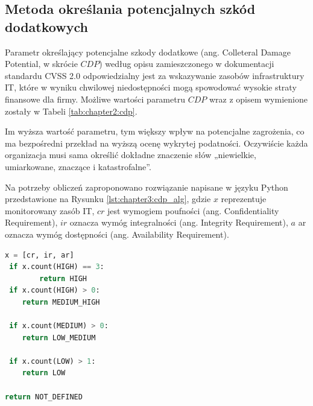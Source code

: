 
\subsection{Metoda określania potencjalnych szkód dodatkowych}
\label{sec:cdp}
Parametr określający potencjalne szkody dodatkowe (ang. Colleteral Damage Potential, w skrócie $CDP$) według opisu zamieszczonego w dokumentacji standardu CVSS 2.0 \cite{cvsspecification} odpowiedzialny jest za wskazywanie zasobów infrastruktury IT, które w wyniku chwilowej niedostępności mogą spowodować wysokie straty finansowe dla firmy. Możliwe wartości parametru $CDP$ wraz z opisem wymienione zostały w Tabeli \ref{tab:chapter2:cdp}. 


\bigbreak
Im wyższa wartość parametru, tym większy wpływ na potencjalne zagrożenia, co ma bezpośredni przekład na wyższą ocenę wykrytej podatności. Oczywiście każda organizacja musi sama określić dokładne znaczenie słów „niewielkie, umiarkowane, znaczące i katastrofalne”.

\bigbreak
Na potrzeby obliczeń zaproponowano rozwiązanie napisane w języku Python przedstawione na Rysunku \ref{lst:chapter3:cdp_alg}, gdzie $x$ reprezentuje monitorowany zasób IT, $cr$ jest wymogiem poufności (ang. Confidentiality Requirement), $ir$ oznacza wymóg integralności (ang. Integrity Requirement), $a$ ar oznacza wymóg dostępności (ang. Availability Requirement).

\begin{lstlisting}[caption={Algorytm określający wartość parametru. CDP dla monitorowanego zasobu.}, label={lst:chapter3:cdp_alg}, language=Python, captionpos=b]
 x = [cr, ir, ar]
 if x.count(HIGH) == 3:
        return HIGH
 if x.count(HIGH) > 0:
    return MEDIUM_HIGH

 if x.count(MEDIUM) > 0:
    return LOW_MEDIUM

 if x.count(LOW) > 1:
    return LOW

return NOT_DEFINED
\end{lstlisting}

